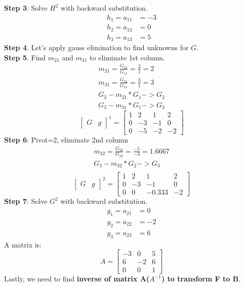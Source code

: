 \documentclass{article}
\begin{document}
\textbf{Step 3}: Solve $H^2$ with backward substitution.
\begin{align}
	h_1=a_{11}&=-3\\h_2=a_{12}&=0\\h_3=a_{13}&=5
\end{align}
\textbf{Step 4}. Let's apply gauss elimination to find unknowns for $G$.\\
\textbf{Step 5}. Find $m_{21}$ and $m_{31}$ to eliminate 1st column.\\
\begin{align}
	m_{21}=\frac{G_{21}}{G_{11}}=\frac{2}{1}=2\\
	m_{31}=\frac{G_{31}}{G_{11}}=\frac{3}{1}=3\\
	G_2-m_{21}*G_1 -> G_2\\
	G_3-m_{31}*G_1 -> G_3
\end{align}
\[
\left[
\begin{array}{c|c}
G&g
\end{array}
\right]^1
=
\left[
\begin{array}{ccc|c}
	1&2&1&2\\
	0&-3&-1&0\\
	0&-5&-2&-2 
\end{array}
\right]
\]
\textbf{Step 6}: Pivot=2, eliminate 2nd column
\begin{align}
	m_{32}=\frac{G_{32}}{G_{22}}=\frac{-5}{-3}=1.6667\\
	G_3-m_{32}*G_2 -> G_3\\
\end{align}
\[
\left[
\begin{array}{c|c}
G&g
\end{array}
\right]^2
=
\left[
\begin{array}{ccc|c}
	1&2&1&2\\
	0&-3&-1&0\\
	0&0&-0.333&-2
\end{array}
\right]
\]
\textbf{Step 7}: Solve $G^2$ with backward substitution.
\begin{align}
	g_1=a_{21}&=0\\g_2=a_{22}&=-2\\g_3=a_{23}&=6
\end{align}
A matrix is:
\[
A
=
\begin{bmatrix}
	-3&0&5\\
	6&-2&6\\
	0&0&1
\end{bmatrix}
\]
Lastly, we need to find \textbf{inverse of matrix A($A^{-1}$) to transform F to B}.
\end{document}
